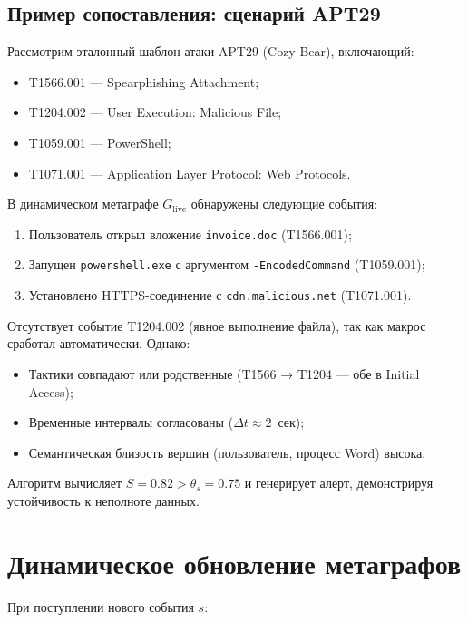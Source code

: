 \subsection{Пример сопоставления: сценарий APT29}

Рассмотрим эталонный шаблон атаки APT29 (Cozy Bear), включающий:
\begin{itemize}
    \item T1566.001 — Spearphishing Attachment;
    \item T1204.002 — User Execution: Malicious File;
    \item T1059.001 — PowerShell;
    \item T1071.001 — Application Layer Protocol: Web Protocols.
\end{itemize}

В динамическом метаграфе $G_{\text{live}}$ обнаружены следующие события:
\begin{enumerate}
    \item Пользователь открыл вложение \texttt{invoice.doc} (T1566.001);
    \item Запущен \texttt{powershell.exe} с аргументом \texttt{-EncodedCommand} (T1059.001);
    \item Установлено HTTPS-соединение с \texttt{cdn.malicious.net} (T1071.001).
\end{enumerate}

Отсутствует событие T1204.002 (явное выполнение файла), так как макрос сработал автоматически. Однако:
\begin{itemize}
    \item Тактики совпадают или родственные (T1566 → T1204 — обе в Initial Access);
    \item Временные интервалы согласованы ($\Delta t \approx 2$~сек);
    \item Семантическая близость вершин (пользователь, процесс Word) высока.
\end{itemize}

Алгоритм вычисляет $S = 0.82 > \theta_s = 0.75$ и генерирует алерт, демонстрируя устойчивость к неполноте данных.

\section{Динамическое обновление метаграфов}\label{sec:ch3/sect4}

При поступлении нового события $s$:

